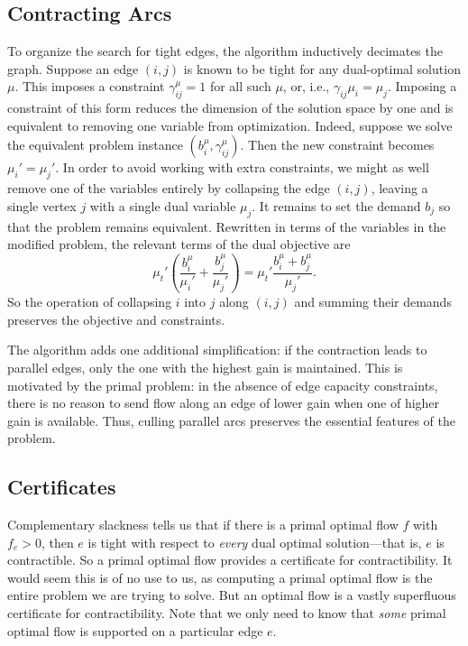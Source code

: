 \documentclass[12pt]{article}
\theoremstyle{definition}
\newcommand{\biu}{b_{i}^{\mu}}
\newcommand{\gij}{\gamma_{ij}}
\newcommand{\giij}{\gamma_{ij}^{\mu}}
\begin{document}
    \subsection{Contracting Arcs}
    To organize the search for tight edges, the algorithm inductively decimates the graph.
    Suppose an edge $(i, j)$ is known to be tight for any dual-optimal solution $\mu$. This
    imposes a constraint $\giij = 1$ for all such $\mu$, or, i.e., $\gij \mu_i = \mu_j$.
    Imposing a constraint of this form reduces the dimension of the solution
    space by one and is equivalent to removing one variable from optimization. Indeed,
    suppose we solve the equivalent problem instance $(\biu, \giij)$. Then the new constraint
    becomes $\mu_i' = \mu_j'$. In order to avoid working with extra constraints, we might
    as well remove one of the variables entirely by collapsing the edge $(i, j)$, leaving a single
    vertex $j$ with a single dual variable $\mu_j$. It remains to set the demand $b_j$ so
    that the problem remains equivalent. Rewritten in terms of the variables in
    the modified problem, the relevant terms of the dual objective are
    \[ \mu_t' \left(\frac{b_i^\mu}{\mu_i'} + \frac{b_j^\mu}{\mu_j'}\right)
     = \mu_t' \frac{b_i^\mu + b_j^\mu}{\mu_j'}. \]
	So the operation of collapsing $i$ into $j$ along $(i, j)$ and summing their demands
	preserves the objective and constraints.
	
	The algorithm adds one additional simplification: if the contraction leads to parallel edges,
	only the one with the highest gain is maintained. This is motivated by the primal problem: in
	the absence of edge capacity constraints, there is no reason to send flow along an edge of
	lower gain when one of higher gain is available. Thus, culling parallel arcs preserves the
	essential features of the problem.
	
	\subsection{Certificates}
	Complementary slackness tells us that if there is a primal optimal flow $f$ with
	$f_e > 0$, then $e$ is tight with respect to \emph{every} dual optimal solution---that
	is, $e$ is contractible. So a primal optimal flow provides a certificate for contractibility.
	It would seem this is of no use to us, as computing a primal optimal flow is the entire
	problem we are trying to solve. But an optimal flow is a vastly superfluous certificate
	for contractibility. Note that we only need to know that \emph{some}
	primal optimal flow is supported on a particular edge $e$.
	
\end{document}
